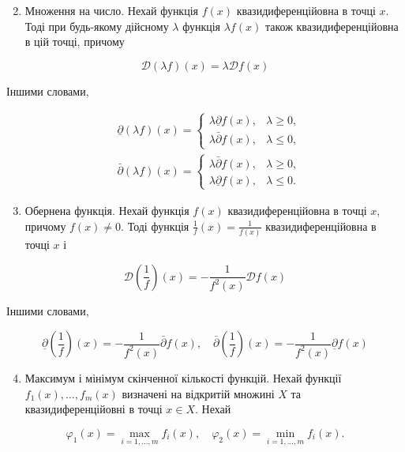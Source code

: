 \documentclass[10pt]{article}
\begin{document}
\begin{enumerate}
  \setcounter{enumi}{1}
  \item Множення на число. Нехай функція $f(x)$ квазидиференційовна в точці $x$. Тоді при будь-якому дійсному $\lambda$ функція $\lambda f(x)$ також квазидиференційовна в цій точці, причому
\end{enumerate}

$$
\mathcal{D}(\lambda f)(x)=\lambda \mathcal{D} f(x)
$$

Іншими словами,

$$
\begin{aligned}
& \underline{\partial}(\lambda f)(x)= \begin{cases}\lambda \underline{\partial} f(x), & \lambda \geq 0, \\
\lambda \bar{\partial} f(x), & \lambda \leq 0,\end{cases} \\
& \bar{\partial}(\lambda f)(x)= \begin{cases}\lambda \bar{\partial} f(x), & \lambda \geq 0, \\
\lambda \underline{\partial} f(x), & \lambda \leq 0 .\end{cases}
\end{aligned}
$$

\begin{enumerate}
  \setcounter{enumi}{2}
  \item Обернена функція. Нехай функція $f(x)$ квазидиференційовна в точці $x$, причому $f(x) \neq 0$. Тоді функція $\frac{1}{f}(x)=\frac{1}{f(x)}$ квазидиференційовна в точці $x$ і
\end{enumerate}

$$
\mathcal{D}\left(\frac{1}{f}\right)(x)=-\frac{1}{f^{2}(x)} \mathcal{D} f(x)
$$

Іншими словами,

$$
\underline{\partial}\left(\frac{1}{f}\right)(x)=-\frac{1}{f^{2}(x)} \bar{\partial} f(x), \quad \bar{\partial}\left(\frac{1}{f}\right)(x)=-\frac{1}{f^{2}(x)} \underline{\partial} f(x)
$$

\begin{enumerate}
  \setcounter{enumi}{3}
  \item Максимум і мінімум скінченної кількості функцій. Нехай функції $f_{1}(x), \ldots, f_{m}(x)$ визначені на відкритій множині $X$ та квазидиференційовні в точці $x \in X$. Нехай
\end{enumerate}

$$
\varphi_{1}(x)=\max _{i=1, \ldots, m} f_{i}(x), \quad \varphi_{2}(x)=\min _{i=1, \ldots, m} f_{i}(x) .
$$
\end{document}
